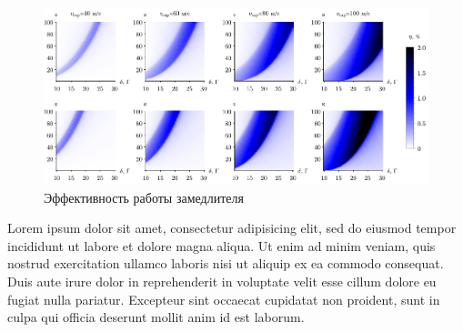 \begin{figure}[h]
    \centering
    \hspace{2 mm} 
    \includegraphics{figs/etas_v3.pdf}
    \caption{Эффективность работы замедлителя}
    \label{fig:eta2}
\end{figure}


Lorem ipsum dolor sit amet, consectetur adipisicing elit, sed do eiusmod
tempor incididunt ut labore et dolore magna aliqua. Ut enim ad minim veniam,
quis nostrud exercitation ullamco laboris nisi ut aliquip ex ea commodo
consequat. Duis aute irure dolor in reprehenderit in voluptate velit esse
cillum dolore eu fugiat nulla pariatur. Excepteur sint occaecat cupidatat non
proident, sunt in culpa qui officia deserunt mollit anim id est laborum.

